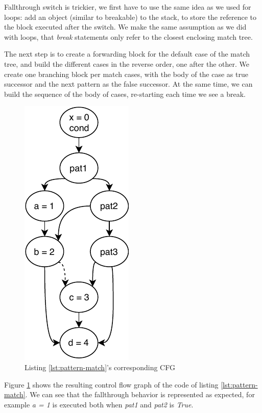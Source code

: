 \begin{enumerate}
	Fallthrough switch is trickier, we first have to use the same idea as we used for loops: add an object (similar to breakable) to the stack, to store the reference to the block executed after the switch.
	We make the same assumption as we did with loops, that \emph{break} statements only refer to the closest enclosing match tree. 
	
	The next step is to create a forwarding block for the default case of the match tree, and build the different cases in the reverse order, one after the other. 
	We create one branching block per match cases, with the body of the case as true successor and the next pattern as the false successor. 
	At the same time, we can build the sequence of the body of cases, re-starting each time we see a break.
	
	
	
	\begin{figure}[h]
		\caption{Listing \ref{lst:pattern-match}'s corresponding CFG }
		\label{figure:pat-mat-cfg}
		\includegraphics[]{figure/pat-mat-cfg.pdf}
	\end{figure}
	
	Figure \ref{figure:pat-mat-cfg} shows the resulting control flow graph of the code of listing \ref{lst:pattern-match}. We can see that the fallthrough behavior is represented as expected, for example \emph{a = 1} is executed both when \emph{pat1} and \emph{pat2} is \emph{True}.
	

\end{enumerate}
